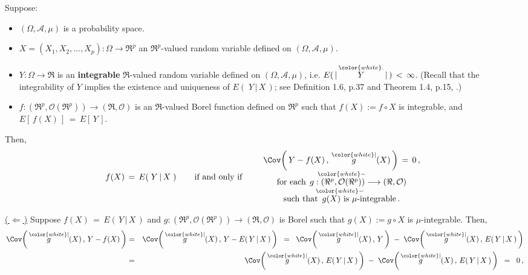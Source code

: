 \begin{theorem}
\label{definingEYXByOrthogonality}
\mbox{}
\vskip 0.2cm
\noindent
Suppose:
\begin{itemize}
\item
	$(\Omega,\mathcal{A},\mu)$ is a probability space.
\item
	$X = (X_{1}, X_{2}, \ldots, X_{p}) : \Omega \longrightarrow \Re^{p}$ an $\Re^{p}$-valued random variable
	defined on $(\Omega,\mathcal{A},\mu)$.
\item
	$Y : \Omega \longrightarrow \Re$ is an \textbf{\color{red}integrable} $\Re$-valued random variable
	defined on $(\Omega,\mathcal{A},\mu)$,
	i.e. $E(\,\vert\,\overset{{\color{white}.}}{Y}\,\vert\,)\,<\,\infty$.
	\vskip 0.01cm
	(Recall that the integrability of $Y$ implies the existence and uniqueness of $E\!\left(\;Y\,\vert\,X\,\right)$;
	see Definition 1.6, p.37 and Theorem 1.4, p.15, \cite{Shao2003}.)
\item
	$f : (\Re^{p},\mathcal{O}(\Re^{p})) \longrightarrow (\Re,\mathcal{O})$ is an $\Re$-valued Borel function
	defined on $\Re^{p}$ such that $f(X) := f\circ X$ is integrable, and $E\!\left[\,f(X)\,\right] \,=\, E\!\left[\,Y\,\right]$.
\end{itemize}
Then,
\begin{equation*}
	f(X) \,=\, E\!\left(\;Y\,\vert\,X\;\right)
	\quad\quad\textnormal{if and only if}\quad\quad
	\begin{array}{c}
	\Cov\!\left(\,Y-f(X)\,,\,\overset{{\color{white}\vert}}{g}(X)\,\right) \,=\, 0\,,
	\\
	\overset{{\color{white}-}}{\textnormal{for each}\;\, g : (\Re^{p},\mathcal{O}(\Re^{p}))\longrightarrow (\Re,\mathcal{O})}
	\\
	\overset{{\color{white}-}}{\textnormal{such that \,$g(X)$ is $\mu$-integrable}}\,.
	\end{array}
\end{equation*}
\end{theorem}
\proof
\vskip 0.1cm
\noindent
\underline{(\,$\Longleftarrow$\,)}\quad
Suppose $f(X) \,=\, E\!\left(\,Y\,\vert\,X\,\right)$ and
$g : (\Re^{p},\mathcal{O}(\Re^{p}))\longrightarrow (\Re,\mathcal{O})$
is Borel such that $g(X) := g \circ X$ is $\mu$-integrable.
Then,
\begin{eqnarray*}
\Cov\!\left(\,\overset{{\color{white}\vert}}{g}(X)\,,\,Y-f(X)\,\right)
&=&
	\Cov\!\left(\,\overset{{\color{white}\vert}}{g}(X)\,,\,Y-E\!\left(\,Y\,\vert\,X\,\right)\,\right)
\;\;=\;\;
	\Cov\!\left(\,\overset{{\color{white}\vert}}{g}(X)\,,\,Y\,\right)
	\; - \;
	\Cov\!\left(\,\overset{{\color{white}\vert}}{g}(X)\,,\,E\!\left(\,Y\,\vert\,X\,\right)\,\right)
\\
&=&
	\Cov\!\left(\,\overset{{\color{white}\vert}}{g}(X)\,,\,E\!\left(\,Y\,\vert\,X\,\right)\,\right)
	\; - \;
	\Cov\!\left(\,\overset{{\color{white}\vert}}{g}(X)\,,\,E\!\left(\,Y\,\vert\,X\,\right)\,\right)
\;\;=\;\;
	0\,,
\end{eqnarray*}
